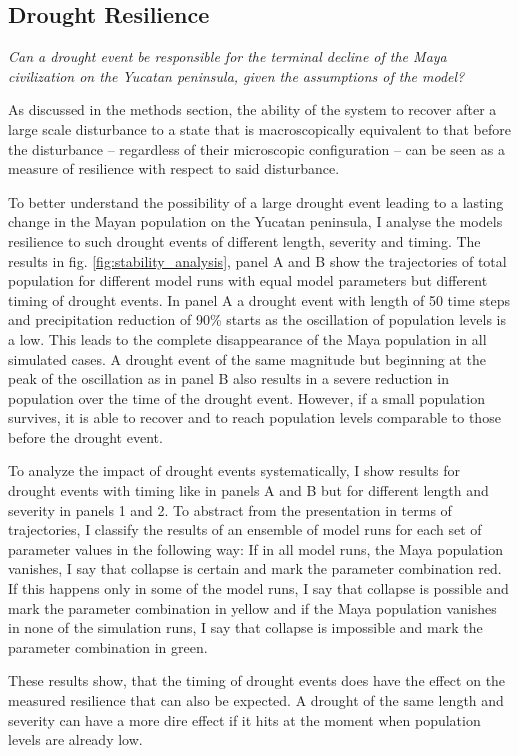 \subsection{Drought Resilience}
\textit{Can a drought event be responsible for the terminal decline of the Maya civilization on the Yucatan peninsula, given the assumptions of the model?}

As discussed in the methods section, the ability of the system to recover after a large scale disturbance to a state that is macroscopically equivalent to that before the disturbance -- regardless of their microscopic configuration -- can be seen as a measure of resilience with respect to said disturbance.

To better understand the possibility of a large drought event leading to a lasting change in the Mayan population on the Yucatan peninsula, I analyse the models resilience to such drought events of different length, severity and timing. The results in fig. \ref{fig:stability_analysis}, panel A and B show the trajectories of total population for different model runs with equal model parameters but different timing of drought events. In panel A a drought event with length of 50 time steps and precipitation reduction of 90\% starts as the oscillation of population levels is a low. This leads to the complete disappearance of the Maya population in all simulated cases. A drought event of the same magnitude but beginning at the peak of the oscillation as in panel B also results in a severe reduction in population over the time of the drought event. However, if a small population survives, it is able to recover and to reach population levels comparable to those before the drought event.

To analyze the impact of drought events systematically, I show results for drought events with timing like in panels A and B but for different length and severity in panels 1 and 2. To abstract from the presentation in terms of trajectories, I classify the results of an ensemble of model runs for each set of parameter values in the following way: If in all model runs, the Maya population vanishes, I say that collapse is certain and mark the parameter combination red. If this happens only in some of the model runs, I say that collapse is possible and mark the parameter combination in yellow and if the Maya population vanishes in none of the simulation runs, I say that collapse is impossible and mark the parameter combination in green.

These results show, that the timing of drought events does have the effect on the measured resilience that can also be expected. A drought of the same length and severity can have a more dire effect if it hits at the moment when population levels are already low.

